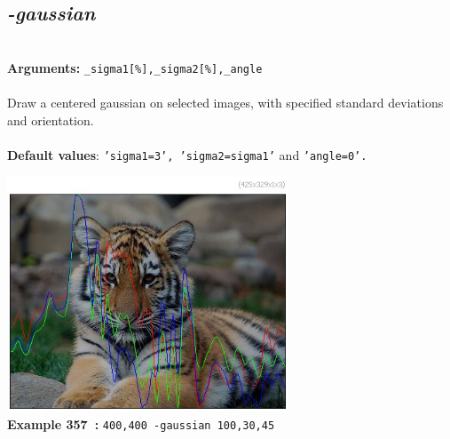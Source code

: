 \documentclass[a4paper,11pt,twoside]{book}
\begin{document}
\subsection{\emph{-gaussian} }\vspace*{-0.5em}
~\\\textbf{Arguments: } 
{\small \texttt{\_sigma1[\%],\_sigma2[\%],\_angle}}\\~\\
Draw a centered gaussian on selected images, with specified standard deviations and orientation.
~\\~\\\textbf{Default values}: {\small \texttt{'sigma1=3', 'sigma2=sigma1'} and \texttt{'angle=0'.}}
\begin{center}\includegraphics[keepaspectratio=true,height=7cm,width=\textwidth]{img/gmic_def357.jpg}\\
{\footnotesize \textbf{Example 357~:} \texttt{400,400 -gaussian 100,30,45}}
\end{center}
\end{document}
